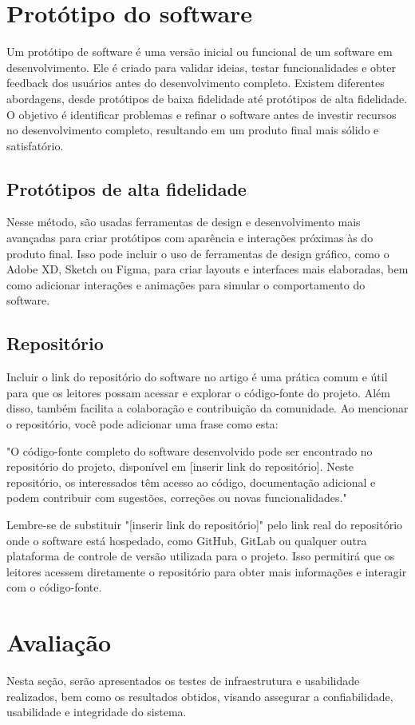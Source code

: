 \documentclass[12pt]{article}
\begin{document}
\section{Protótipo do software}
Um protótipo de software é uma versão inicial ou funcional de um software em desenvolvimento. Ele é criado para validar ideias, testar funcionalidades e obter feedback dos usuários antes do desenvolvimento completo. Existem diferentes abordagens, desde protótipos de baixa fidelidade até protótipos de alta fidelidade. O objetivo é identificar problemas e refinar o software antes de investir recursos no desenvolvimento completo, resultando em um produto final mais sólido e satisfatório.

\subsection{Protótipos de alta fidelidade}
 Nesse método, são usadas ferramentas de design e desenvolvimento mais avançadas para criar protótipos com aparência e interações próximas às do produto final. Isso pode incluir o uso de ferramentas de design gráfico, como o Adobe XD, Sketch ou Figma, para criar layouts e interfaces mais elaboradas, bem como adicionar interações e animações para simular o comportamento do software.
 
 \subsection{Repositório}
Incluir o link do repositório do software no artigo é uma prática comum e útil para que os leitores possam acessar e explorar o código-fonte do projeto. Além disso, também facilita a colaboração e contribuição da comunidade. Ao mencionar o repositório, você pode adicionar uma frase como esta:

"O código-fonte completo do software desenvolvido pode ser encontrado no repositório do projeto, disponível em [inserir link do repositório]. Neste repositório, os interessados têm acesso ao código, documentação adicional e podem contribuir com sugestões, correções ou novas funcionalidades."

Lembre-se de substituir "[inserir link do repositório]" pelo link real do repositório onde o software está hospedado, como GitHub, GitLab ou qualquer outra plataforma de controle de versão utilizada para o projeto. Isso permitirá que os leitores acessem diretamente o repositório para obter mais informações e interagir com o código-fonte.

\section{Avaliação}
Nesta seção, serão apresentados os testes de infraestrutura e usabilidade realizados, bem como os resultados obtidos, visando assegurar a confiabilidade, usabilidade e integridade do sistema.
\end{document}

